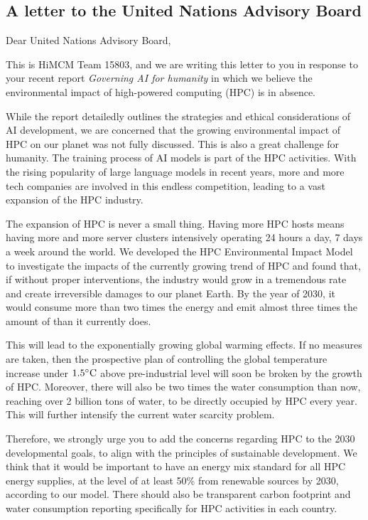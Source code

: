 \documentclass[12pt]{article}
\begin{document}
\newpage

\begin{center}
	\section{A letter to the United Nations Advisory Board}
\end{center}

\bigskip
Dear United Nations Advisory Board,
\bigskip
\bigskip

This is HiMCM Team 15803, and we are writing this letter to you in response to your recent report \textit{Governing AI for humanity} in which we believe the environmental impact of high-powered computing (HPC) is in absence.

While the report detailedly outlines the strategies and ethical considerations of AI development, we are concerned that the growing environmental impact of HPC on our planet was not fully discussed. This is also a great challenge for humanity. The training process of AI models is part of the HPC activities. With the rising popularity of large language models in recent years, more and more tech companies are involved in this endless competition, leading to a vast expansion of the HPC industry.

The expansion of HPC is never a small thing. Having more HPC hosts means having more and more server clusters intensively operating 24 hours a day, 7 days a week around the world. We developed the HPC Environmental Impact Model to investigate the impacts of the currently growing trend of HPC and found that, if without proper interventions, the industry would grow in a tremendous rate and create irreversible damages to our planet Earth. By the year of 2030, it would consume more than two times the energy and emit almost three times the amount of  than it currently does.

This will lead to the exponentially growing global warming effects. If no measures are taken, then the prospective plan of controlling the global temperature increase under $1.5 \rm ^\circ C$ above pre-industrial level will soon be broken by the growth of HPC. Moreover, there will also be two times the water consumption than now, reaching over 2 billion tons of water, to be directly occupied by HPC every year. This will further intensify the current water scarcity problem.

Therefore, we strongly urge you to add the concerns regarding HPC to the 2030 developmental goals, to align with the principles of sustainable development. We think that it would be important to have an energy mix standard for all HPC energy supplies, at the level of at least 50\% from renewable sources by 2030, according to our model. There should also be transparent carbon footprint and water consumption reporting specifically for HPC activities in each country.
\end{document}
